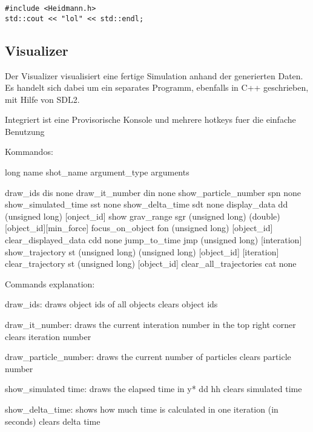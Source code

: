 \begin{verbatim}
#include <Heidmann.h>
std::cout << "lol" << std::endl;
\end{verbatim}


\subsection{Visualizer}
Der Visualizer visualisiert eine fertige Simulation anhand der generierten Daten.
Es handelt sich dabei um ein separates Programm, ebenfalls in C++ geschrieben,
mit Hilfe von SDL2.

Integriert ist eine Provisorische Konsole und mehrere hotkeys fuer die einfache Benutzung


Kommandos:

long name           shot\_name           argument\_type                   arguments

draw\_ids                dis             none
draw\_it\_number          din             none
show\_particle\_number    spn             none
show\_simulated\_time     sst             none    
show\_delta\_time         sdt             none    
display\_data            dd              (unsigned long)                 [onject\_id]
show grav\_range         sgr             (unsigned long) (double)        [object\_id][min\_force]
focus\_on\_object         fon             (unsigned long)                 [object\_id]
clear\_displayed\_data    cdd             none 
jump\_to\_time            jmp             (unsigned long)                 [interation]
show\_trajectory         st              (unsigned long) (unsigned long) [object\_id] [iteration]
clear\_trajectory        st              (unsigned long)                 [object\_id]
clear\_all\_trajectories cat             none

Commands explanation:

draw\_ids:
    draws object ids of all objects
    clears object ids

draw\_it\_number:
    draws the current interation number in the top right corner
    clears iteration number

draw\_particle\_number:
    draws the current number of particles
    clears particle number

show\_simulated time:
    draws the elapsed time in y* dd hh
    clears simulated time

show\_delta\_time:
    shows how much time is calculated in one iteration (in seconds)
    clears delta time

